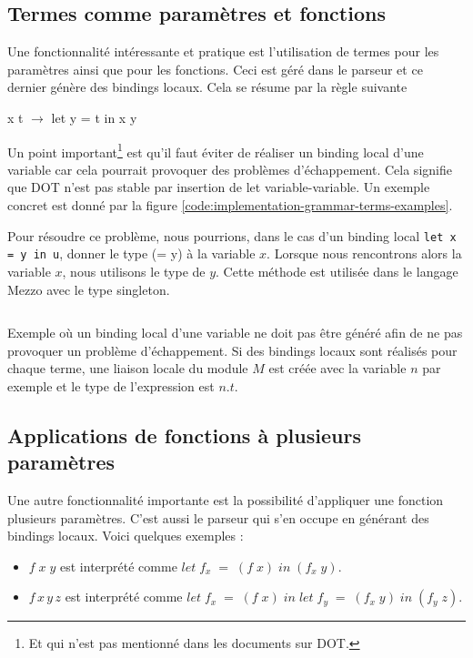\subsection*{Termes comme paramètres et fonctions}

Une fonctionnalité intéressante et pratique est l'utilisation de
termes pour les paramètres ainsi que pour les fonctions. Ceci
est géré dans le parseur et ce dernier génère des bindings locaux. Cela se
résume par la règle suivante

\begin{center}
  x t $\rightarrow$ let y = t in x y
\end{center}

Un point important\footnote{Et qui n'est pas mentionné dans les documents sur
DOT.} est qu'il faut éviter de réaliser un binding local d'une variable car
cela pourrait provoquer des problèmes d'échappement. Cela signifie que DOT n'est
pas stable par insertion de let variable-variable. Un exemple concret est donné
par la figure \ref{code:implementation-grammar-terms-examples}.

Pour résoudre ce problème, nous pourrions, dans le cas d'un binding local
\verb|let x = y in u|, donner le type (= y) à la variable $x$. Lorsque nous
rencontrons alors la variable $x$, nous utilisons le type de $y$. Cette méthode
est utilisée dans le langage Mezzo\cite{} avec le type singleton.

\begin{listing}
  \label{code:implementation-grammar-terms-examples}
  \inputminted{OCaml}{codes/terms_binding_variable.rml}
  \caption{Exemple où un binding local d'une variable ne doit pas être généré
    afin de ne pas provoquer un problème d'échappement. Si des bindings locaux
    sont réalisés pour chaque terme, une liaison locale du module $M$ est
    créée avec la variable $n$ par exemple et le type de l'expression est $n.t$.}
\end{listing}

\subsection*{Applications de fonctions à plusieurs paramètres}

Une autre fonctionnalité importante est la possibilité d'appliquer une fonction plusieurs
paramètres. C'est aussi le parseur qui s'en occupe en générant
des bindings locaux. Voici quelques exemples :

\begin{itemize}
\item $f \; x \; y$ est interprété comme $let \; f_{x} \; = \; (f \; x) \; in \;
  (f_{x} \; y)$.
\item $f \,  x \, y \, z$ est interprété comme $let \; f_{x} \; = \; (f \; x) \;
  in \; let \; f_{y} \; = \; (f_{x} \; y) \; in \; (f_{y} \; z)$.
\end{itemize}

